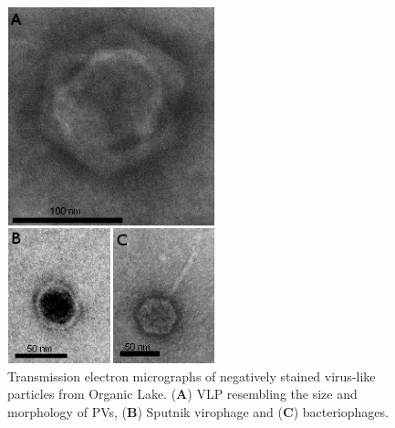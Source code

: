 \begin{figure}
\centering
\includegraphics[width=60mm]{olv_figures/TEM.jpg}
\caption[Transmission electron micrographs of Organic Lake \acp{VLP}]{Transmission electron micrographs of negatively stained virus-like particles from Organic Lake. 
(\textbf{A}) \ac{VLP} resembling the size and morphology of \acp{PV},
(\textbf{B}) Sputnik virophage and (\textbf{C}) bacteriophages.
}
\label{fig:TEM}

\end{figure}

